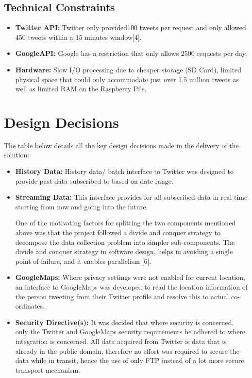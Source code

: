 \documentclass[12pt]{article} %
\begin{document}
\subsection {Technical Constraints}

\begin{itemize}
	\item \textbf{Twitter API:} Twitter only provided100 tweets per request and only allowed 450 tweets within a 15 minutes window[4].
	\item \textbf{GoogleAPI:} Google has a restriction that only allows 2500 requests   per day.
	\item \textbf{Hardware:} Slow I/O processing due to cheaper storage (SD Card), limited physical space that could only accommodate just over 1,5 million tweets as well as limited RAM on the Raspberry Pi's.
\end{itemize}

	
	\section {Design Decisions}
	
	The table below details all the key design decisions made in the delivery of the solution:
	
\begin{itemize} 
	\item \textbf{History Data:} History data/ batch interface to Twitter was designed to provide past data subscribed to based on date range.
	
	\item \textbf{Streaming Data:} 
	This interface provides for all subscribed data in real-time starting from now and going into the future.
	
	One of the motivating factors for splitting the two components mentioned above was that the project followed a divide and conquer strategy to decompose
	the data collection problem into simpler sub-components. The divide and conquer strategy in software design, helps in avoiding a single point of failure, and it 
	enables parallelism [6].
	
	\item \textbf{GoogleMaps:} 
	 Where privacy settings were not enabled for current location, an interface to GoogleMaps was developed to read the location information of the person tweeting from their Twitter profile and resolve this to actual co-ordinates.
	
	\item \textbf{Security Directive(s):} 
	It was decided that where security is concerned, only the Twitter and GoogleMaps security requirements be adhered to where integration is concerned. All data acquired from Twitter is data that is already in the public domain, therefore no effort was required to secure the data while in transit, hence the use of only FTP instead of a lot more secure transport mechanism.
\end{itemize}
	
\end{document}
